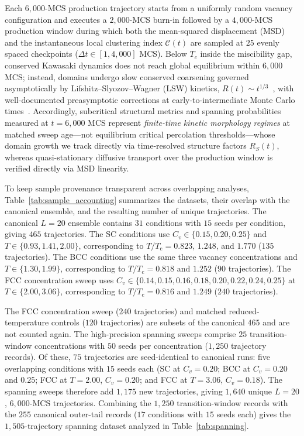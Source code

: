 \documentclass[aps,pre,reprint,superscriptaddress,amsmath,amssymb,floatfix]{revtex4-2}
\begin{document}
Each $6{,}000$-MCS production trajectory starts from a uniformly random vacancy configuration and executes a $2{,}000$-MCS burn-in followed by a $4{,}000$-MCS production window during which both the mean-squared displacement (MSD) and the instantaneous local clustering index $\mathcal{C}(t)$ are sampled at $25$ evenly spaced checkpoints ($\Delta t \in [1, 4{,}000]$ MCS). Below $T_c$ inside the miscibility gap, conserved Kawasaki dynamics does not reach global equilibrium within $6{,}000$ MCS; instead, domains undergo slow conserved coarsening governed asymptotically by Lifshitz--Slyozov--Wagner (LSW) kinetics, $R(t) \sim t^{1/3}$~\cite{Lifshitz1961,Wagner1961,Bray1994}, with well-documented preasymptotic corrections at early-to-intermediate Monte Carlo times~\cite{Huse1986,Amar1988,Majumder2011}. Accordingly, subcritical structural metrics and spanning probabilities measured at $t = 6{,}000$ MCS represent \emph{finite-time kinetic morphology regimes} at matched sweep age---not equilibrium critical percolation thresholds---whose domain growth we track directly via time-resolved structure factors $R_S(t)$, whereas quasi-stationary diffusive transport over the production window is verified directly via MSD linearity.

To keep sample provenance transparent across overlapping analyses, Table~\ref{tab:sample_accounting} summarizes the datasets, their overlap with the canonical ensemble, and the resulting number of unique trajectories. The canonical $L=20$ ensemble contains $31$ conditions with $15$ seeds per condition, giving $465$ trajectories. The SC conditions use $C_v\in\{0.15,0.20,0.25\}$ and $T\in\{0.93,1.41,2.00\}$, corresponding to $T/T_{\mathrm{c}}=0.823$, $1.248$, and $1.770$ ($135$ trajectories). The BCC conditions use the same three vacancy concentrations and $T\in\{1.30,1.99\}$, corresponding to $T/T_{\mathrm{c}}=0.818$ and $1.252$ ($90$ trajectories). The FCC concentration sweep uses $C_v\in\{0.14,0.15,0.16,0.18,0.20,0.22,0.24,0.25\}$ at $T\in\{2.00,3.06\}$, corresponding to $T/T_{\mathrm{c}}=0.816$ and $1.249$ ($240$ trajectories).

The FCC concentration sweep ($240$ trajectories) and matched reduced-temperature controls ($120$ trajectories) are subsets of the canonical $465$ and are not counted again. The high-precision spanning sweeps comprise $25$ transition-window concentrations with $50$ seeds per concentration ($1{,}250$ trajectory records). Of these, $75$ trajectories are seed-identical to canonical runs: five overlapping conditions with $15$ seeds each (SC at $C_v=0.20$; BCC at $C_v=0.20$ and $0.25$; FCC at $T=2.00$, $C_v=0.20$; and FCC at $T=3.06$, $C_v=0.18$). The spanning sweeps therefore add $1{,}175$ new trajectories, giving $1{,}640$ unique $L=20$, $6{,}000$-MCS trajectories. Combining the $1{,}250$ transition-window records with the $255$ canonical outer-tail records ($17$ conditions with $15$ seeds each) gives the $1{,}505$-trajectory spanning dataset analyzed in Table~\ref{tab:spanning}.
\end{document}
